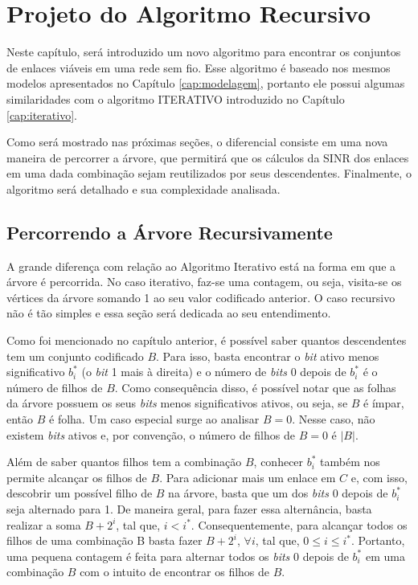 \chapter{Projeto do Algoritmo Recursivo}
\label{cap:recursivo}

Neste capítulo, será introduzido um novo algoritmo para encontrar os conjuntos de enlaces viáveis em uma rede sem fio. Esse algoritmo é baseado nos mesmos modelos apresentados no Capítulo \ref{cap:modelagem}, portanto ele possui algumas similaridades com o algoritmo ITERATIVO introduzido no Capítulo \ref{cap:iterativo}. 

Como será mostrado nas próximas seções, o diferencial consiste em uma nova maneira de percorrer a árvore, que permitirá que os cálculos da SINR dos enlaces em uma dada combinação sejam reutilizados por seus descendentes. Finalmente, o algoritmo será detalhado e sua complexidade analisada.

\section{Percorrendo a Árvore Recursivamente}

A grande diferença com relação ao Algoritmo Iterativo está na forma em que a árvore é percorrida. No caso iterativo, faz-se uma contagem, ou seja, visita-se os vértices da árvore somando 1 ao seu valor codificado anterior. O caso recursivo não é tão simples e essa seção será dedicada ao seu entendimento.

Como foi mencionado no capítulo anterior, é possível saber quantos descendentes tem um conjunto codificado $B$. Para isso, basta encontrar o {\it bit} ativo menos significativo $b_i^*$ (o {\it bit} 1 mais à direita) e o número de {\it bits} 0 depois de $b_i^*$ é o número de filhos de $B$. Como consequência disso, é possível notar que as folhas da árvore possuem os seus {\it bits} menos significativos ativos, ou seja, se $B$ é ímpar, então $B$ é folha. Um caso especial surge ao analisar $B=0$. Nesse caso, não existem {\it bits} ativos e, por convenção, o número de filhos de $B=0$ é $|B|$.

Além de saber quantos filhos tem a combinação $B$, conhecer $b_i^*$ também nos permite alcançar os filhos de $B$. Para adicionar mais um enlace em $C$ e, com isso, descobrir um possível filho de $B$ na árvore, basta que um dos {\it bits} 0 depois de $b_i^*$ seja alternado para 1. De maneira geral, para fazer essa alternância, basta realizar a soma $B + 2^i$, tal que, $i < i^*$. Consequentemente, para alcançar todos os filhos de uma combinação B basta fazer $B + 2^i$, $\forall i$, tal que, $0\leq i\leq i^*$. Portanto, uma pequena contagem é feita para alternar todos os {\it bits} 0 depois de $b_i^*$ em uma combinação $B$ com o intuito de encontrar os filhos de $B$.

